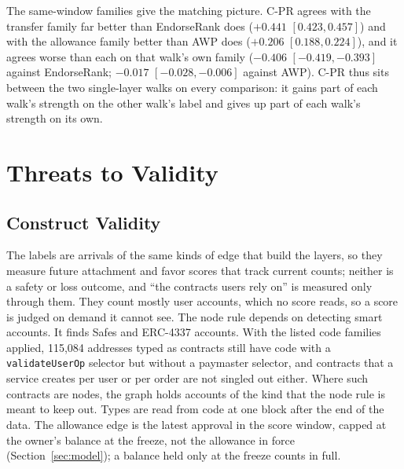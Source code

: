 \documentclass{ieeeaccess}
\newcommand{\cpr}{\mbox{C-PR}}
\begin{document}
The same-window families give the matching picture. \cpr{} agrees with the transfer family far better than EndorseRank does ($+0.441$ $[0.423,0.457]$) and with the allowance family better than AWP does ($+0.206$ $[0.188,0.224]$), and it agrees worse than each on that walk's own family ($-0.406$ $[-0.419,-0.393]$ against EndorseRank; $-0.017$ $[-0.028,-0.006]$ against AWP). \cpr{} thus sits between the two single-layer walks on every comparison: it gains part of each walk's strength on the other walk's label and gives up part of each walk's strength on its own.

\section{Threats to Validity}
\label{sec:threats}

\subsection{Construct Validity}
The labels are arrivals of the same kinds of edge that build the layers, so they measure future attachment and favor scores that track current counts; neither is a safety or loss outcome, and ``the contracts users rely on'' is measured only through them. They count mostly user accounts, which no score reads, so a score is judged on demand it cannot see. The node rule depends on detecting smart accounts. It finds Safes and ERC-4337 accounts. With the listed code families applied, 115,084 addresses typed as contracts still have code with a \texttt{validateUserOp} selector but without a paymaster selector, and contracts that a service creates per user or per order are not singled out either. Where such contracts are nodes, the graph holds accounts of the kind that the node rule is meant to keep out. Types are read from code at one block after the end of the data. The allowance edge is the latest approval in the score window, capped at the owner's balance at the freeze, not the allowance in force (Section~\ref{sec:model}); a balance held only at the freeze counts in full.
\end{document}
